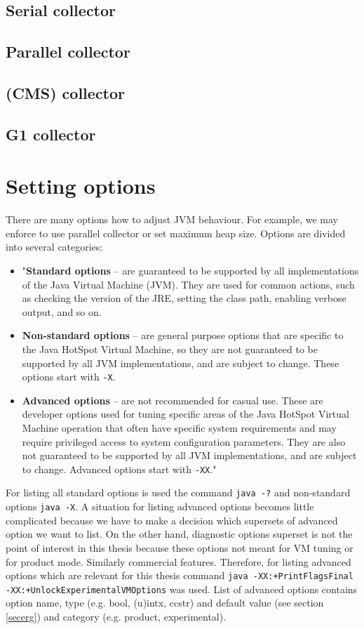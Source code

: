 \documentclass[
  digital, %
  oneside,
  notable, %
  nolof,     %
  nolot     %
]{fithesis3}
\begin{document}
	\subsection{Serial collector}
	\subsection{Parallel collector}
	\subsection{(CMS) collector}
	\subsection{G1 collector}

\section{Setting options}\label{secoptions}
There are many options how to adjust JVM behaviour. For example, we may enforce to use parallel collector or set maximum heap size. Options are divided into several categories:
\begin{itemize}
	\item "\textbf{Standard options} -- are guaranteed to be supported by all implementations of the Java Virtual Machine (JVM). They are used for common actions, such as checking the version of the JRE, setting the class path, enabling verbose output, and so on.
	\item \textbf{Non-standard options} -- are general purpose options that are specific to the Java HotSpot Virtual Machine, so they are not guaranteed to be supported by all JVM implementations, and are subject to change. These options start with \texttt{-X}.
	\item \textbf{Advanced options} -- are not recommended for casual use. These are developer options used for tuning specific areas of the Java HotSpot Virtual Machine operation that often have specific system requirements and may require privileged access to system configuration parameters. They are also not guaranteed to be supported by all JVM implementations, and are subject to change. Advanced options start with \texttt{-XX}." \cite{java}
\end{itemize}
For listing all standard options is used the command \texttt{java -?} and non-standard options \texttt{java -X}. A situation for listing advanced options becomes little complicated because we have to make a decision which supersets of advanced option we want to list. On the other hand, diagnostic options superset is not the point of interest in this thesis because these options not meant for VM tuning or for product mode. Similarly commercial features. Therefore, for listing advanced options which are relevant for this thesis command \texttt{java -XX:+PrintFlagsFinal -XX:+UnlockExperimentalVMOptions} was used. List of advanced options contains option name, type (e.g. bool, (u)intx, ccstr) and default value (see section \ref{secerg}) and category (e.g. product, experimental).
\end{document}
